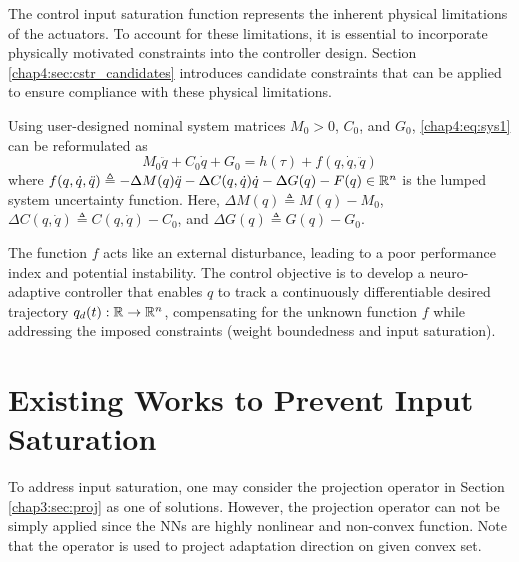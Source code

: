The control input saturation function represents the inherent physical limitations of the actuators. 
To account for these limitations, it is essential to incorporate physically motivated constraints into the controller design. 
Section \ref{chap4:sec:cstr_candidates} introduces candidate constraints that can be applied to ensure compliance with these physical limitations.

Using user-designed nominal system matrices $M_0 > 0$, $C_0$, and $G_0$, \eqref{chap4:eq:sys1} can be reformulated as
\begin{equation}
    M_0\ddot q+C_0\dot q+G_0 = h(\tau) + f(q,\dot q,\ddot q)
    \label{chap4:eq:sys2}
\end{equation}
where $f(q,\dot q,\ddot q) \triangleq -\Delta M(q)\ddot q-\Delta C(q,\dot q)\dot q -\Delta G(q) -F(q)\in\mathbb{R}^n$ is the lumped system uncertainty function. Here, $\Delta M(q)\triangleq M(q)-M_0$, $\Delta C(q,\dot q)\triangleq C(q,\dot q)-C_0$, and $\Delta G(q)\triangleq G(q)-G_0$. 

The function $f$ acts like an external disturbance, leading to a poor performance index and potential instability. 
The control objective is to develop a neuro-adaptive controller that enables $q$ to track a continuously differentiable desired trajectory ${q_d}(t): \mathbb{R} \to \mathbb{R}^n$, compensating for the unknown function $f$ while addressing the imposed constraints (\eg weight boundedness and input saturation).

\section{Existing Works to Prevent Input Saturation} 

To address input saturation, one may consider the projection operator in Section \ref{chap3:sec:proj} as one of solutions.
However, the projection operator can not be simply applied since the NNs are highly nonlinear and non-convex function.
Note that the operator is used to project adaptation direction on given convex set.

